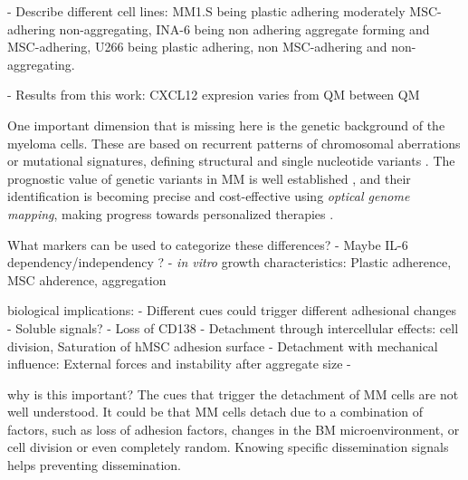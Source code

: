 \unnsubsection{\cadddiversitytitle}%
\label{sec:discussion_cadddiversity}%

- Describe different cell lines: MM1.S being plastic adhering moderately
MSC-adhering non-aggregating, INA-6 being non adhering aggregate forming and
MSC-adhering, U266 being plastic adhering, non MSC-adhering and
non-aggregating.

- Results from this work: CXCL12 expresion varies from QM between QM

One important dimension that is missing here is the genetic background of the
myeloma cells. These are based on recurrent patterns of chromosomal aberrations
or mutational signatures, defining structural and single nucleotide variants
\cite{kumarMultipleMyelomasCurrent2018a,
      hoangMutationalProcessesContributing2019}. The prognostic value of genetic
variants in MM is well established \cite{sharmaPrognosticRoleMYC2021}, and their
identification is becoming precise and cost-effective using \emph{optical
      genome mapping}, making progress towards personalized therapies
\cite{zouComprehensiveApproachEvaluate2024,
      budurleanIntegratingOpticalGenome2024}. 
      

What markers can be used to categorize these differences?
- Maybe IL-6 dependency/independency \cite{sprynskiRoleIGF1Major2009}?
- \textit{in vitro} growth characteristics: Plastic adherence, MSC ahderence, aggregation

\unnsubsection{\caddtriggertitle}%
\label{sec:discussion_caddtrigger}%

biological implications:
- Different cues could trigger different adhesional changes
- Soluble signals?
- Loss of CD138 \cite{akhmetzyanovaDynamicCD138Surface2020}
- Detachment through intercellular effects: cell division, Saturation of hMSC adhesion surface%
- Detachment with mechanical influence: External forces and instability after aggregate size%
-


why is this important?
The cues that trigger the detachment of MM cells are not well understood. It
could be that MM cells detach due to a combination of factors, such as loss of
adhesion factors, changes in the BM microenvironment, or cell division or
even completely random. Knowing specific dissemination signals helps preventing
dissemination.



